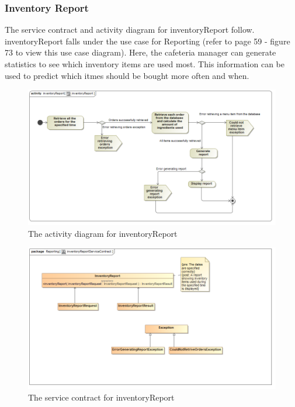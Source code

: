 \documentclass[a4paper,12pt]{report}
\begin{document}
\subsubsection{Inventory Report }
The service contract and activity diagram for inventoryReport follow. inventoryReport falls under the use case for Reporting (refer to page 59 - figure 73 to view this use case diagram). Here, the cafeteria manager can generate statistics to see which inventory items are used most. This information can be used to predict which itmes should be bought more often and when. 
\begin{figure}[H]
  \centering
    \includegraphics[width=1.0\textwidth]{../images/inventoryReportActivityDiagram.png}
    \caption{The activity diagram for inventoryReport} 
\end{figure}
\begin{figure}[H]
  \centering
    \includegraphics[width=1.0\textwidth]{../images/inventoryReportServiceContract.png}
    \caption{The service contract for inventoryReport} 
\end{figure}
\end{document}
